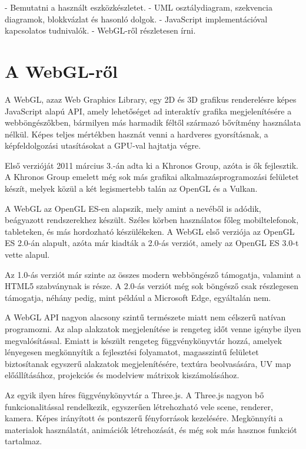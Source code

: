 
- Bemutatni a használt eszközkészletet.
- UML osztálydiagram, szekvencia diagramok, blokkvázlat és hasonló dolgok.
- JavaScript implementációval kapcsolatos tudnivalók.
- WebGL-ről részletesen írni.
\section{A WebGL-ről}
A WebGL, azaz Web Graphics Library, egy 2D és 3D grafikus renderelésre képes JavaScript alapú API, amely lehetőséget ad interaktív grafika megjelenítésére a webböngészőkben, bármilyen más harmadik féltől származó bővítmény használata nélkül. Képes teljes mértékben hasznát venni a hardveres gyorsításnak, a képfeldolgozási utasításokat a GPU-val hajtatja végre. 

Első verzióját 2011 március 3.-án adta ki a Khronos Group, azóta is ők fejlesztik. A Khronos Group emelett még sok más grafikai alkalmazásprogramozási felületet készít, melyek közül a két legismertebb talán az OpenGL és a Vulkan.

A WebGL az OpenGL ES-en alapszik, mely amint a nevéből is adódik, beágyazott rendszerekhez készült. Széles körben használatos főleg mobiltelefonok, tableteken, és más hordozható készülékeken. A WebGL első verziója az OpenGL ES 2.0-án alapult, azóta már kiadták a 2.0-ás verziót, amely az OpenGL ES 3.0-t vette alapul.

Az 1.0-ás verziót már szinte az összes modern webböngésző támogatja, valamint a HTML5 szabványnak is része. A 2.0-ás verziót még sok böngésző csak részlegesen támogatja, néhány pedig, mint például a Microsoft Edge, egyáltalán nem.

A WebGL API nagyon alacsony szintű természete miatt nem célszerű natívan programozni. Az alap alakzatok megjelenítése is rengeteg időt venne igénybe ilyen megvalósítással. Emiatt is készült rengeteg függvénykönyvtár hozzá, amelyek lényegesen megkönnyítik a fejlesztési folyamatot, magasszintű felületet biztosítanak egyszerű alakzatok megjelenítésére, textúra beolvasására, UV map előállításához, projekciós és modelview mátrixok kiszámolásához.

Az egyik ilyen híres függvénykönyvtár a Three.js. A Three.js nagyon bő funkcionalitással rendelkezik, egyszerűen létrehozható vele scene, renderer, kamera. Képes irányított és pontszerű fényforrások kezelésére. Megkönnyíti a materialok használatát, animációk létrehozását, és még sok más hasznos funkciót tartalmaz.

